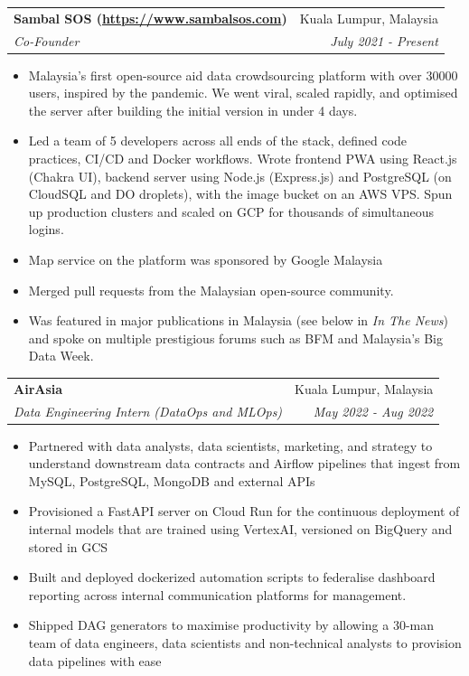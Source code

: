 \documentclass[letterpaper,11pt]{article}
\makeatletter
\newcommand{\resumeItem}[1]{
  \item{
    {#1 \vspace{-2pt}}
  }
}
\newcommand{\resumeSubheading}[4]{
  \vspace{-1pt}\item
    \begin{tabular*}{0.97\textwidth}[t]{l@{\extracolsep{\fill}}r}
      \textbf{#1} & \small{#2} \\
      \textit{#3} & \textit{#4} \\
    \end{tabular*}\vspace{-6pt}
}
\newcommand{\resumeItemListStart}{\begin{itemize}}
\newcommand{\resumeItemListEnd}{\end{itemize}\vspace{-5pt}}
\makeatother
\begin{document}
  \resumeSubheading
  {Sambal SOS (\url{https://www.sambalsos.com})}{Kuala Lumpur, Malaysia}
  {\textit{Co-Founder}}{July 2021 - Present}
  \resumeItemListStart
    \resumeItem{Malaysia's first open-source aid data crowdsourcing platform with over 30000 users, inspired by the pandemic. We went viral, scaled rapidly, and optimised the server after building the initial version in under 4 days.}
    \resumeItem{Led a team of 5 developers across all ends of the stack, defined code practices, CI/CD and Docker workflows. Wrote frontend PWA using React.js (Chakra UI), backend server using Node.js (Express.js) and PostgreSQL (on CloudSQL and DO droplets), with the image bucket on an AWS VPS.
    Spun up production clusters and scaled on GCP for thousands of simultaneous logins.}
    \resumeItem{Map service on the platform was sponsored by Google Malaysia}
    \resumeItem{Merged pull requests from the Malaysian open-source community.} 
    \resumeItem{Was featured in major publications in Malaysia (see below in \textit{In The News}) and spoke on multiple prestigious forums such as BFM and Malaysia's Big Data Week.}
  \resumeItemListEnd


  \resumeSubheading
  {AirAsia}{Kuala Lumpur, Malaysia}
  {\textit{Data Engineering Intern (DataOps and MLOps)}}{May 2022 - Aug 2022}
  \resumeItemListStart
    \resumeItem{Partnered with data analysts, data scientists, marketing, and strategy to understand downstream data contracts and Airflow pipelines that ingest from MySQL, PostgreSQL, MongoDB and external APIs}
    \resumeItem{Provisioned a FastAPI server on Cloud Run for the continuous deployment of internal models that are trained using VertexAI, versioned on BigQuery and stored in GCS}
    \resumeItem{Built and deployed dockerized automation scripts to federalise dashboard reporting across internal communication platforms for management.}
    \resumeItem{Shipped DAG generators to maximise productivity by allowing a 30-man team of data engineers, data scientists and non-technical analysts to provision data pipelines with ease}
  \resumeItemListEnd
\end{document}

